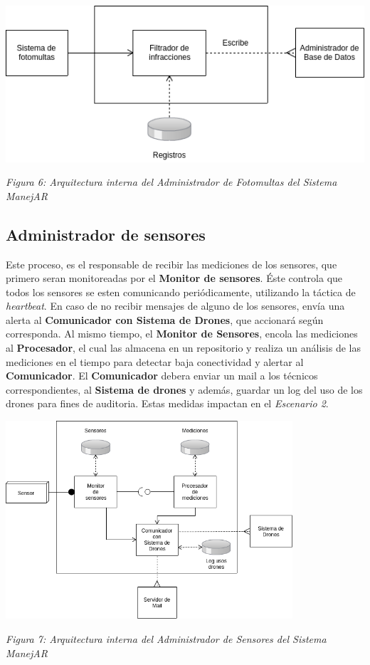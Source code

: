 \begin{center}
  \includegraphics[width=1\textwidth]{./imagenes/arquitectura_tp2/administrador_fotomultas.png}
  \centerline{\textit{Figura 6: Arquitectura interna del Administrador de Fotomultas del Sistema ManejAR}}
\end{center} 

\newpage

\subsection{Administrador de sensores}
Este proceso, es el responsable de recibir las mediciones de los sensores, que 
primero seran monitoreadas por el \textbf{Monitor de sensores}. Éste controla que todos
los sensores se esten comunicando periódicamente, utilizando la táctica de
\textit{heartbeat}. En caso de no recibir mensajes de alguno de los sensores, envía una
alerta al \textbf{Comunicador con Sistema de Drones}, que accionará según corresponda.
Al mismo tiempo, el \textbf{Monitor de Sensores}, encola las mediciones al \textbf{Procesador}, el
cual las almacena en un repositorio y realiza un análisis de las mediciones en
el tiempo para detectar baja conectividad y alertar al \textbf{Comunicador}.
El \textbf{Comunicador} debera enviar un mail a los técnicos correspondientes, al \textbf{Sistema 
de drones} y además, guardar un log del uso de los drones para fines de auditoria.
Estas medidas impactan en el \textit{Escenario 2}.

\begin{center}
  \includegraphics[width=0.8\textwidth]{./imagenes/arquitectura_tp2/administrador_sensores.png}
  \centerline{\textit{Figura 7: Arquitectura interna del Administrador de Sensores del Sistema ManejAR}}
\end{center}


